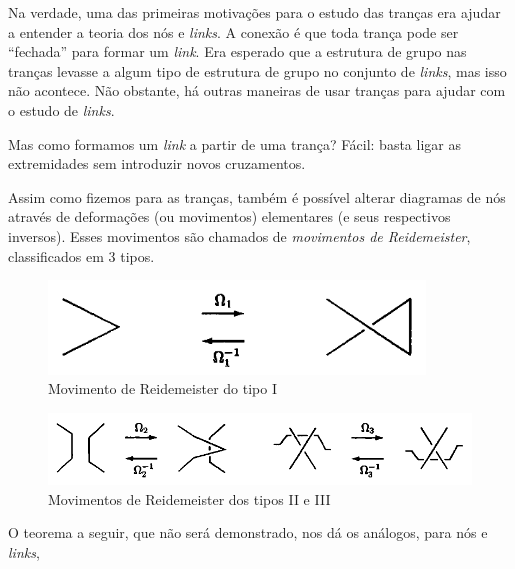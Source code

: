 	\par\vspace{0.3cm} Na verdade, uma das primeiras motivações para o estudo das tranças era ajudar 
	a entender a teoria dos nós e \textit{links}. A conexão é que toda trança pode ser ``fechada'' 
	para formar um \textit{link}. Era esperado que a estrutura de grupo nas tranças levasse a algum 
	tipo de estrutura de grupo no conjunto de \textit{links}, mas isso não acontece. Não obstante, 
	há outras maneiras de usar tranças para ajudar com o estudo de \textit{links}.
	
	\par\vspace{0.3cm} Mas como formamos um \textit{link} a partir de uma trança? Fácil: basta 
	ligar as extremidades sem introduzir novos cruzamentos.
	
	\par\vspace{0.3cm} Assim como fizemos para as tranças, também é possível alterar diagramas de 
	nós através de deformações (ou movimentos) elementares (e seus respectivos inversos). 
	Esses movimentos são chamados de \textit{movimentos de Reidemeister}, classificados em 3 tipos.
	\begin{figure}[H]
		\begin{center}
			\includegraphics[width=10cm]{Images/reidemeister_1.png}
		\end{center}\caption{Movimento de Reidemeister do tipo I}
		\label{reidemeister tipo 1}
	\end{figure}
	\begin{figure}[H]
		\begin{center}
			\includegraphics[width=14cm]{Images/reidemeister_2_e_3.png}
		\end{center}\caption{Movimentos de Reidemeister dos tipos II e III}
		\label{reidemeister tipos 2 e 3}
	\end{figure}
	O teorema a seguir, que não será demonstrado, nos dá os análogos, para nós e \textit{links}, 
